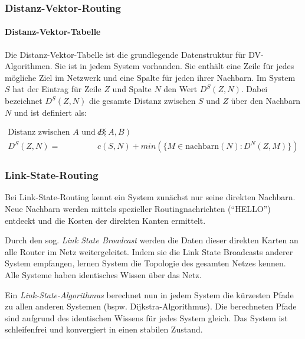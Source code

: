 \documentclass[a4paper, 14pt]{article}
\begin{document}
	\subsubsection{Distanz-Vektor-Routing}

	\paragraph{Distanz-Vektor-Tabelle}

	Die Distanz-Vektor-Tabelle ist die grundlegende Datenstruktur für DV-Algorithmen.
	Sie ist in jedem System vorhanden.
	Sie enthält eine Zeile für jedes mögliche Ziel im Netzwerk und eine Spalte für jeden ihrer Nachbarn.
	Im System $S$ hat der Eintrag für Zeile $Z$ und Spalte $N$ den Wert $D^S(Z, N)$.
	Dabei bezeichnet $D^S(Z, N)$ die gesamte Distanz zwischen $S$ und $Z$ über den Nachbarn $N$ und ist definiert als:

	\begin{align*}
		\text{Distanz zwischen $A$ und $B$: } &c(A, B) \\
		D^S(Z, N) = &c(S, N) + min(\{ M \in \text{nachbarn}(N) : D^N(Z, M) \})
	\end{align*}


	\subsubsection{Link-State-Routing}

	Bei Link-State-Routing kennt ein System zunächst nur seine direkten Nachbarn.
	Neue Nachbarn werden mittels spezieller Routingnachrichten (\enquote{HELLO}) entdeckt und die Kosten der direkten Kanten ermittelt.

	Durch den sog. \emph{Link State Broadcast} werden die Daten dieser direkten Karten an alle Router im Netz weitergeleitet.
	Indem sie die Link State Broadcasts anderer System empfangen, lernen System die Topologie des gesamten Netzes kennen.
	Alle Systeme haben identisches Wissen über das Netz.

	Ein \emph{Link-State-Algorithmus} berechnet nun in jedem System die kürzesten Pfade zu allen anderen Systemen (bspw. Dijkstra-Algorithmus).
	Die berechneten Pfade sind aufgrund des identischen Wissens für jedes System gleich.
	Das System ist schleifenfrei und konvergiert in einen stabilen Zustand.
\end{document}
